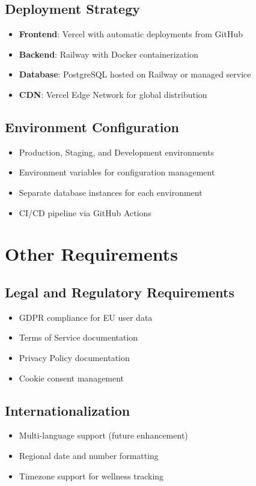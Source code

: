 \documentclass[12pt,a4paper]{article}
\begin{document}
\subsection{Deployment Strategy}
\begin{itemize}
    \item \textbf{Frontend}: Vercel with automatic deployments from GitHub
    \item \textbf{Backend}: Railway with Docker containerization
    \item \textbf{Database}: PostgreSQL hosted on Railway or managed service
    \item \textbf{CDN}: Vercel Edge Network for global distribution
\end{itemize}

\subsection{Environment Configuration}
\begin{itemize}
    \item Production, Staging, and Development environments
    \item Environment variables for configuration management
    \item Separate database instances for each environment
    \item CI/CD pipeline via GitHub Actions
\end{itemize}

\newpage
\section{Other Requirements}

\subsection{Legal and Regulatory Requirements}
\begin{itemize}
    \item GDPR compliance for EU user data
    \item Terms of Service documentation
    \item Privacy Policy documentation
    \item Cookie consent management
\end{itemize}

\subsection{Internationalization}
\begin{itemize}
    \item Multi-language support (future enhancement)
    \item Regional date and number formatting
    \item Timezone support for wellness tracking
\end{itemize}
\end{document}

